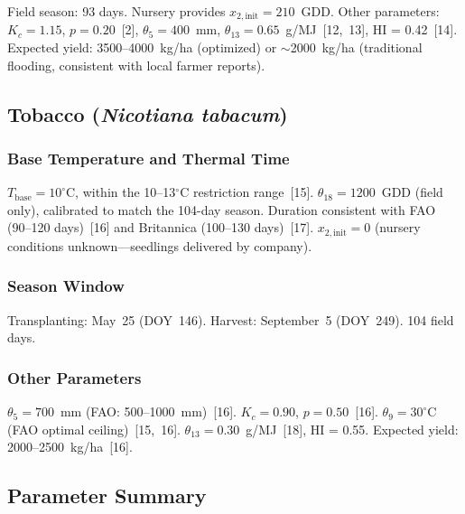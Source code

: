 \documentclass[12pt, a4paper]{article}
\begin{document}
Field season: 93 days. Nursery provides $x_{2,\text{init}} = 210$~GDD. Other parameters: $K_c = 1.15$, $p = 0.20$~[2], $\theta_5 = 400$~mm, $\theta_{13} = 0.65$~g/MJ~[12,~13], HI = 0.42~[14]. Expected yield: 3500--4000~kg/ha (optimized) or $\sim$2000~kg/ha (traditional flooding, consistent with local farmer reports).

\subsection{Tobacco (\emph{Nicotiana tabacum})}

\subsubsection{Base Temperature and Thermal Time}

$T_{\text{base}} = 10^{\circ}$C, within the 10--13$^{\circ}$C restriction range~[15]. $\theta_{18} = 1200$~GDD (field only), calibrated to match the 104-day season. Duration consistent with FAO (90--120 days)~[16] and Britannica (100--130 days)~[17]. $x_{2,\text{init}} = 0$ (nursery conditions unknown---seedlings delivered by company).

\subsubsection{Season Window}

Transplanting: May~25 (DOY~146). Harvest: September~5 (DOY~249). 104 field days.

\subsubsection{Other Parameters}

$\theta_5 = 700$~mm (FAO: 500--1000~mm)~[16]. $K_c = 0.90$, $p = 0.50$~[16]. $\theta_9 = 30^{\circ}$C (FAO optimal ceiling)~[15,~16]. $\theta_{13} = 0.30$~g/MJ~[18], HI = 0.55. Expected yield: 2000--2500~kg/ha~[16].

\subsection{Parameter Summary}
\end{document}
